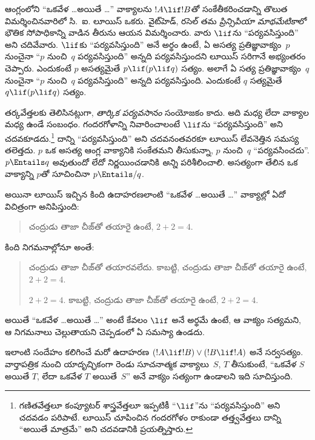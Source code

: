 \documentclass[../../../include/open-logic-section]{subfiles}
\begin{document}


ఆంగ్లంలోని ``ఒకవేళ \dots అయితే \dots'' వాక్యాలను $!A \lif !B$తో
సంకేతీకరించడాన్ని తొలుత విమర్శించినవారిలో సి.~ఐ. లూయిస్ ఒకరు.
వైట్‌హెడ్, రసెల్ తమ \emph{ప్రిన్సిపియా మాథమేటికా}లో భౌతిక
సోపాధికాన్ని వాడిన తీరును ఆయన విమర్శించారు. వారు $\lif$ను
``పర్యవసిస్తుంది'' అని చదివేవారు. $\lif$కు ``పర్యవసిస్తుంది''
అనే అర్థం ఉంటే, ఏ అసత్య ప్రతిజ్ఞావాక్యం~$p$ నుంచైనా
``$p$ నుంచి~$q$ పర్యవసిస్తుంది'' అన్నది పర్యవసిస్తుందని
లూయిస్ సరిగానే అభ్యంతరం చెప్పారు. ఎందుకంటే $p$ అసత్యమైతే
$p \lif (p \lif q)$ సత్యం. అలాగే ఏ సత్య ప్రతిజ్ఞావాక్యం~$q$ నుంచైనా
``$p$ నుంచి~$q$ పర్యవసిస్తుంది'' అన్నది పర్యవసిస్తుంది.
ఎందుకంటే $q$ సత్యమైతే $q \lif (p \lif q)$ సత్యం.

తర్కవేత్తలకు తెలిసినట్లుగా, \emph{తార్కిక పర్యవసానం} సంయోజకం కాదు.
అది  మధ్య లేదా వాక్యాల మధ్య ఉండే సంబంధం.
గందరగోళాన్ని నివారించాలంటే $\lif$ను ``పర్యవసిస్తుంది'' అని
చదవకూడదు.\footnote{గణితవేత్తలూ కంప్యూటర్ శాస్త్రవేత్తలూ ఇప్పటికీ
  ``$\lif$''ను ``పర్యవసిస్తుంది'' అని చదవడం పరిపాటే. లూయిస్
  చూపించిన గందరగోళం రాకుండా తత్త్వవేత్తలు దాన్ని ``అయితే
  మాత్రమే'' అని చదవడానికి ప్రయత్నిస్తారు.}
దాన్ని ``పర్యవసిస్తుంది'' అని చదవనంతవరకూ లూయిస్ లేవనెత్తిన సమస్య తలెత్తదు. $p$ ఒక
అసత్య ఆంగ్ల వాక్యానికి సంకేతమని తీసుకున్నా, $p$ నుంచి~$q$
``పర్యవసించదు''. $p \Entails q$ అవుతుందో లేదో నిర్ణయించడానికి
\emph{అన్ని} 
పరిశీలించాలి. అసత్యంగా తేలిన ఒక వాక్యాన్ని $p$తో సూచించినా
$p \Entails/ q$.

అయినా లూయిస్ ఇచ్చిన కింది ఉదాహరణలాంటి ``ఒకవేళ \dots అయితే
\dots'' వాక్యాల్లో ఏదో విచిత్రంగా అనిపిస్తుంది:
\begin{quote}
చంద్రుడు తాజా చీజ్‌తో తయారై ఉంటే,
$2+2=4$.
\end{quote}
కింది నిగమనాల్లోనూ అంతే:
\begin{quote}
  చంద్రుడు తాజా చీజ్‌తో తయారవలేదు.
  కాబట్టి, చంద్రుడు తాజా చీజ్‌తో
  తయారై ఉంటే, $2+2=4$.

  $2+2 = 4$. కాబట్టి, చంద్రుడు
  తాజా చీజ్‌తో తయారై ఉంటే,
  $2+2=4$.
\end{quote}
అయితే ``ఒకవేళ \dots అయితే \dots'' అంటే
కేవలం $\lif$ అనే అర్థమే ఉంటే, ఆ వాక్యం సత్యమని,
ఆ నిగమనాలు చెల్లుతాయని చెప్పడంలో ఏ సమస్యా ఉండదు.

ఇలాంటి సందేహం కలిగించే మరో ఉదాహరణ
$(!A \lif !B) \lor (!B \lif
!A)$ అనే సర్వసత్యం. వార్తాపత్రిక
నుంచి యాదృచ్ఛికంగా రెండు సూచనాత్మక
వాక్యాలు~$S$, $T$ తీసుకుంటే,
``ఒకవేళ $S$ అయితే $T$, లేదా
ఒకవేళ $T$ అయితే~$S$'' అనే
వాక్యం సత్యంగా ఉండాలని ఇది సూచిస్తుంది.
\end{document}
